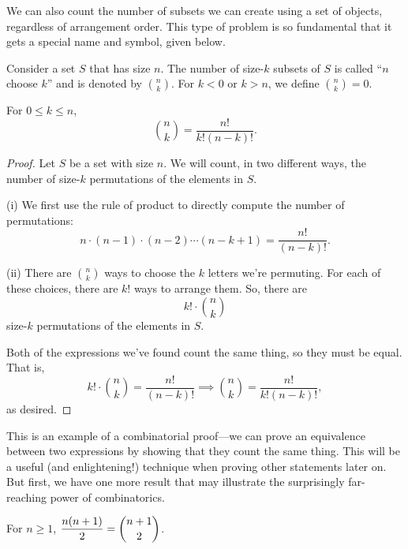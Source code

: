 \documentclass[../m055main.tex]{subfiles}
\begin{document}
\pagebreak

We can also count the number of subsets we can create using a set of objects, regardless of arrangement order.
This type of problem is so fundamental that it gets a special name and symbol, given below.

\begin{definition}[Combination]
    Consider a set $S$ that has size $n$.
    The number of size-$k$ subsets of $S$ is called ``$n$ choose $k$'' and is denoted by ${n \choose k}$.
    For $k < 0$ or $k > n$, we define ${n \choose k} = 0$.
\end{definition}

\begin{theorem}
    For $0 \leq k \leq n$,
    \[ {n \choose k} = \frac{n!}{k! (n-k)!}. \]
\end{theorem}

\begin{proof}
    Let $S$ be a set with size $n$.
    We will count, in two different ways, the number of size-$k$ permutations of the elements in $S$.
    \smallskip

    (i) We first use the rule of product to directly compute the number of permutations:
    \[ n \cdot (n-1) \cdot (n-2) \cdots (n-k+1) = \frac{n!}{(n-k)!}. \]

    (ii) There are ${n \choose k}$ ways to choose the $k$ letters we're permuting.
    For each of these choices, there are $k!$ ways to arrange them.
    So, there are
    \[ k! \cdot {n \choose k} \]
    size-$k$ permutations of the elements in $S$.
    \smallskip

    Both of the expressions we've found count the same thing, so they must be equal.
    That is,
    \[ k! \cdot {n \choose k} = \frac{n!}{(n-k)!} \implies {n \choose k} = \frac{n!}{k!(n-k)!}, \]
    as desired.
\end{proof}

This is an example of a combinatorial proof---we can prove an equivalence between two expressions by showing that they count the same thing.
This will be a useful (and enlightening!) technique when proving other statements later on.
But first, we have one more result that may illustrate the surprisingly far-reaching power of combinatorics.

\begin{theorem}[]
    For $n \geq 1$, $\displaystyle \frac{n(n+1)}{2} = {n+1 \choose 2}$.
\end{theorem}
\end{document}

